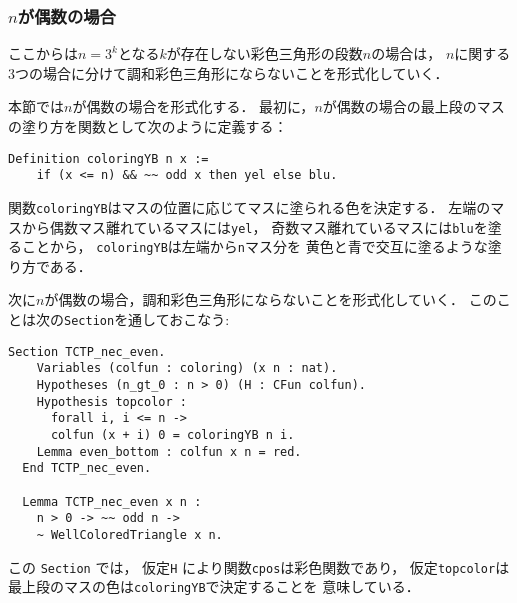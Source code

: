 \subsubsection{$n$が偶数の場合} \label{sec:even}
ここからは$n=3^k$となる$k$が存在しない彩色三角形の段数$n$の場合は，
$n$に関する3つの場合に分けて調和彩色三角形にならないことを形式化していく．

本節では$n$が偶数の場合を形式化する．
最初に，$n$が偶数の場合の最上段のマスの塗り方を関数として次のように定義する：
\begin{lstlisting}[language=Coq]
  Definition coloringYB n x :=
    if (x <= n) && ~~ odd x then yel else blu.
\end{lstlisting}
関数{\tt{coloringYB}}はマスの位置に応じてマスに塗られる色を決定する．
左端のマスから偶数マス離れているマスには{\tt{yel}}，
奇数マス離れているマスには{\tt{blu}}を塗ることから，
{\tt{coloringYB}}は左端から{\tt{n}}マス分を
黄色と青で交互に塗るような塗り方である．

次に$n$が偶数の場合，調和彩色三角形にならないことを形式化していく．
このことは次の{\tt{Section}}を通しておこなう:
\begin{lstlisting}[language=Coq]
  Section TCTP_nec_even.
    Variables (colfun : coloring) (x n : nat).
    Hypotheses (n_gt_0 : n > 0) (H : CFun colfun).
    Hypothesis topcolor :
      forall i, i <= n ->
      colfun (x + i) 0 = coloringYB n i.
    Lemma even_bottom : colfun x n = red.
  End TCTP_nec_even.
    
  Lemma TCTP_nec_even x n :
    n > 0 -> ~~ odd n ->
    ~ WellColoredTriangle x n.  
\end{lstlisting}
この {\tt{Section}} では，
仮定{\tt{H}} により関数{\tt{cpos}}は彩色関数であり，
仮定{\tt{topcolor}}は最上段のマスの色は{\tt{coloringYB}}で決定することを
意味している．

